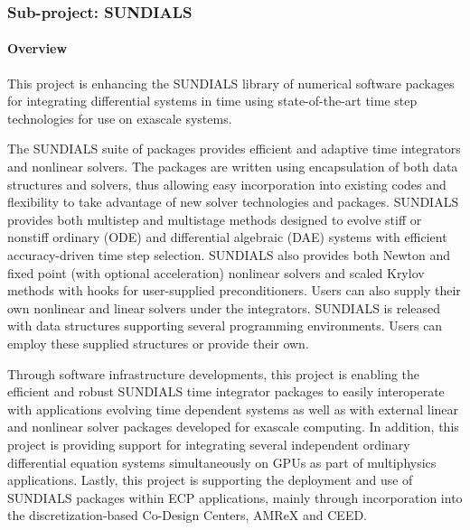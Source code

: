 \subsubsection{ Sub-project: SUNDIALS} 
\label{subsubsect:SUNDIALS-hypre}

\paragraph{Overview} 

This project is enhancing the SUNDIALS library of numerical software packages for integrating differential systems in time using state-of-the-art time step technologies for use on exascale systems.  

The SUNDIALS suite of packages provides efficient and adaptive time integrators and nonlinear solvers.  The packages are written using encapsulation of both data structures and solvers, thus allowing easy incorporation into existing codes and flexibility to take advantage of new solver technologies and packages.  SUNDIALS provides both multistep and multistage methods designed to evolve stiff or nonstiff ordinary (ODE) and differential algebraic (DAE) systems
with efficient accuracy-driven time step selection.
SUNDIALS also provides both Newton and fixed point (with optional acceleration) nonlinear solvers and scaled Krylov methods with hooks for user-supplied preconditioners.  Users can also supply their own nonlinear and linear solvers under the integrators.  SUNDIALS is released with data structures supporting several programming environments.  Users can employ these supplied structures or provide their own. 

Through software infrastructure developments, this project is enabling the efficient and robust SUNDIALS time integrator packages to easily interoperate with applications evolving time dependent systems as well as with external linear and nonlinear solver packages developed for exascale computing.  In addition, this project is providing support for integrating several independent ordinary differential equation systems simultaneously on GPUs as part of multiphysics applications.  Lastly, this project is supporting the deployment and use of SUNDIALS packages within ECP applications, mainly through incorporation into the discretization-based Co-Design Centers, AMReX and CEED.




